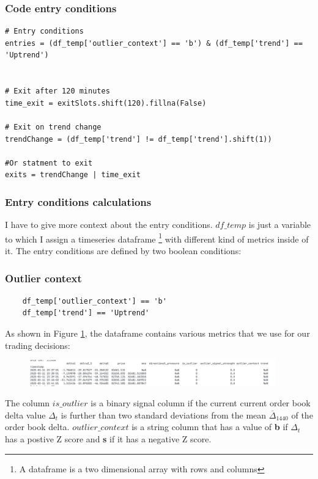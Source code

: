 \documentclass[12pt]{article}
\begin{document}
\subsubsection*{Code entry conditions}

\begin{verbatim}
# Entry conditions
entries = (df_temp['outlier_context'] == 'b') & (df_temp['trend'] == 'Uptrend')


# Exit after 120 minutes
time_exit = exitSlots.shift(120).fillna(False)

# Exit on trend change
trendChange = (df_temp['trend'] != df_temp['trend'].shift(1))

#Or statment to exit
exits = trendChange | time_exit
\end{verbatim}




\newpage
\subsubsection*{Entry conditions calculations}
I have to give more context about the entry conditions. $df\_temp$ is just a variable to which I assign a timeseries dataframe \footnote{A dataframe is a two dimensional array with rows and columns} with different kind of metrics inside of it. The entry conditions are defined by two boolean conditions:


\subsubsection*{Outlier context}


\begin{verbatim}
    df_temp['outlier_context'] == 'b'
    df_temp['trend'] == 'Uptrend'
\end{verbatim}

As shown in Figure \ref{fig:outlier_context}, the dataframe contains various metrics that we use for our trading decisions:

\begin{figure}[h]
    \centering
    \includegraphics[width=0.95\textwidth]{imgs/dataframeHead.png}
    \caption{}
    \label{fig:outlier_context}
\end{figure}


The column $is\_outlier$ is a binary signal column if the current current order book delta value $\Delta_t$ is further than two standard deviations from the mean $\overline{\Delta}_{1440}$ of the order book delta.
$outlier\_context$ is a string column that has a value of \textbf{b} if $\Delta_t$ has a postive Z score and \textbf{s} if it has a negative Z score.
\end{document}
